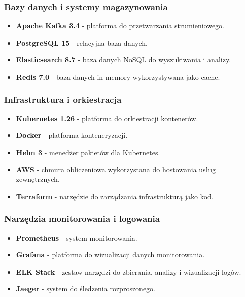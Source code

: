 \subsubsection{Bazy danych i systemy magazynowania}
\label{subsubsec:bazy_danych}

\begin{itemize}
    \item \textbf{Apache Kafka 3.4} - platforma do przetwarzania strumieniowego.
    \item \textbf{PostgreSQL 15} - relacyjna baza danych.
    \item \textbf{Elasticsearch 8.7} - baza danych NoSQL do wyszukiwania i analizy.
    \item \textbf{Redis 7.0} - baza danych in-memory wykorzystywana jako cache.
\end{itemize}

\subsubsection{Infrastruktura i orkiestracja}
\label{subsubsec:infrastruktura}

\begin{itemize}
    \item \textbf{Kubernetes 1.26} - platforma do orkiestracji kontenerów.
    \item \textbf{Docker} - platforma konteneryzacji.
    \item \textbf{Helm 3} - menedżer pakietów dla Kubernetes.
    \item \textbf{AWS} - chmura obliczeniowa wykorzystana do hostowania usług zewnętrznych.
    \item \textbf{Terraform} - narzędzie do zarządzania infrastrukturą jako kod.
\end{itemize}

\subsubsection{Narzędzia monitorowania i logowania}
\label{subsubsec:monitorowanie}

\begin{itemize}
    \item \textbf{Prometheus} - system monitorowania.
    \item \textbf{Grafana} - platforma do wizualizacji danych monitorowania.
    \item \textbf{ELK Stack} - zestaw narzędzi do zbierania, analizy i wizualizacji logów.
    \item \textbf{Jaeger} - system do śledzenia rozproszonego.
\end{itemize}


